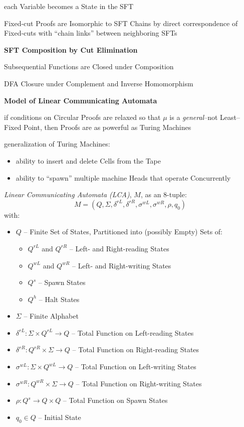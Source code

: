 each Variable becomes a State in the SFT

Fixed-cut Proofs are Isomorphic to SFT Chains by direct correspondence
of Fixed-cuts with ``chain links'' between neighboring SFTs


\textbf{SFT Composition by Cut Elimination}

Subsequential Functions are Closed under Composition

DFA Closure under Complement and Inverse Homomorphism


\textbf{Model of Linear Communicating Automata}

if conditions on Circular Proofs are relaxed so that $\mu$ is a
\emph{general}--not Least--Fixed Point, then Proofs are as powerful as
Turing Machines

generalization of Turing Machines:
\begin{itemize}
  \item ability to insert and delete Cells from the Tape
  \item ability to ``spawn'' multiple machine Heads that operate
    Concurrently
\end{itemize}

\emph{Linear Communicating Automata (LCA)}, $M$, as an $8$-tuple:
\[
  M = (Q,\Sigma,\delta^{rL},\delta^{rR},\sigma^{wL},\sigma^{wR},\rho,q_0)
\]
with:
\begin{itemize}
  \item $Q$ -- Finite Set of States, Partitioned into (possibly
    Empty) Sets of:
    \begin{itemize}
      \item $Q^{rL}$ and $Q^{rR}$ -- Left- and Right-reading States
      \item $Q^{wL}$ and $Q^{wR}$ -- Left- and Right-writing States
      \item $Q^s$ -- Spawn States
      \item $Q^h$ -- Halt States
    \end{itemize}
  \item $\Sigma$ -- Finite Alphabet
  \item $\delta^{rL} : \Sigma \times Q^{rL} \rightarrow Q$ -- Total
    Function on Left-reading States
  \item $\delta^{rR} : Q^{rR} \times \Sigma \rightarrow Q$ -- Total
    Function on Right-reading States
  \item $\sigma^{wL} : \Sigma \times Q^{wL} \rightarrow Q$ -- Total
    Function on Left-writing States
  \item $\sigma^{wR} : Q^{wR} \times \Sigma \rightarrow Q$ -- Total
    Function on Right-writing States
  \item $\rho : Q^s \rightarrow Q \times Q$ -- Total Function on Spawn
    States
  \item $q_0 \in Q$ -- Initial State
\end{itemize}


